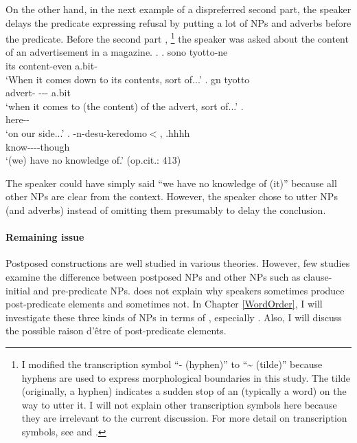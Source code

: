 On the other hand, in the next example of a dispreferred second part,
the speaker delays the predicate expressing refusal
by putting a lot of NPs and adverbs before the predicate.
Before the second part \Next,%
 \footnote{
 I modified the transcription symbol ``- (hyphen)'' to ``{\textasciitilde} (tilde)'' because hyphens are used to express morphological boundaries in this study.
 The tilde (originally, a hyphen) indicates a sudden stop of an  (typically a word) on the way to utter it.
 I will not explain other transcription symbols here because
 they are irrelevant to the current discussion.
 For more detail on transcription symbols,
 see  and .
 }
the speaker was asked about the content of an advertisement in a magazine.
%
\ex.
 \ag. sono  tyotto-ne \\
      its \hspace{0.2cm}content-even a.bit- \\
      `When it comes down to its contents, sort of...'
 \bg.  gn  tyotto \\
      advert-  --- a.bit \\
      `when it comes to (the content) of the advert, sort of...'
 \bg.  \\
      here-- \\
      `on our side...'
 \bg. -n-desu-keredomo$<$, .hhhh \\
      know----though \\
      `(we) have no knowledge of.'
      \hfill{(op.cit.: 413)}

The speaker could have simply said ``we have no knowledge of (it)''
because all other NPs are clear from the context.
However, the speaker chose to utter NPs (and adverbs) instead of omitting them presumably to delay the conclusion.

\paragraph{Remaining issue}

Postposed constructions are well studied in various theories.
However, few studies examine the difference between postposed NPs and
other NPs such as clause-initial and pre-predicate NPs.
 does not explain why speakers sometimes produce
post-predicate elements and sometimes not.
In Chapter \ref{WordOrder},
I will investigate these three kinds of NPs in terms of ,
especially .
Also, I will discuss the possible raison d'{\^{e}}tre of post-predicate elements.

